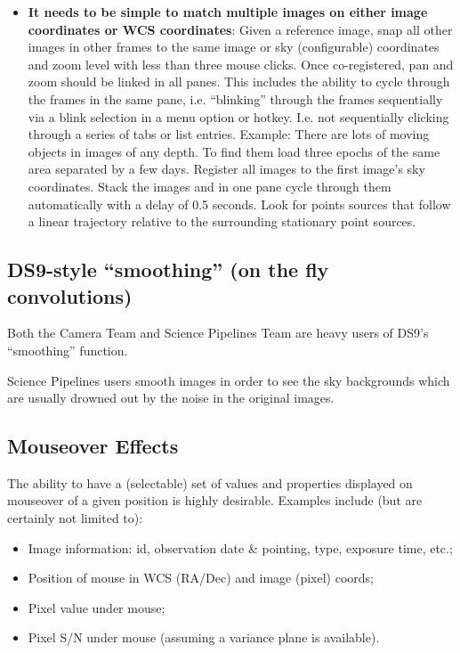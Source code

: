 \begin{itemize}
\item \textbf{It needs to be simple to match multiple images on either image coordinates or WCS coordinates}:
Given a reference image, snap all other images in other frames to the same image or sky (configurable) coordinates and zoom level with less than three mouse clicks.
Once co-registered, pan and zoom should be linked in all panes.
This includes the ability to cycle through the frames in the same pane, i.e. ``blinking'' through the frames sequentially via a blink selection in a menu option or hotkey.  I.e. not sequentially clicking through a series of tabs or list entries.
Example: There are lots of moving objects in images of any depth.  To find them load three epochs of the same area separated by a few days.  Register all images to the first image's sky coordinates.  Stack the images and in one pane cycle through them automatically with a delay of 0.5 seconds.  Look for points sources that follow a linear trajectory relative to the surrounding stationary point sources.
\end{itemize}

\subsection{DS9-style ``smoothing'' (on the fly convolutions)}
Both the Camera Team and Science Pipelines Team are heavy users of DS9's ``smoothing'' function.

Science Pipelines users smooth images in order to see the sky backgrounds which are usually drowned out by the noise in the original images.


\subsection{Mouseover Effects}
The ability to have a (selectable) set of values and properties displayed on mouseover of a given position is highly desirable.  Examples include (but are certainly not limited to):
\begin{itemize}
\item{Image information: id, observation date \& pointing, type, exposure time, etc.;}
\item{Position of mouse in WCS (RA/Dec) and image (pixel) coords;}
\item{Pixel value under mouse;}
\item{Pixel S/N under mouse (assuming a variance plane is available).}
\end{itemize}

